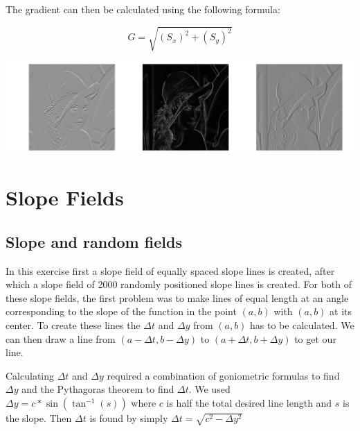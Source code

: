 \documentclass[a4paper,12px]{article}
\begin{document}
The gradient can then be calculated using the following formula:

$$ G = \sqrt{(S_x)^2 + (S_y)^2} $$

\begin{center}
    \includegraphics[width=\textwidth]{sobel}
\end{center}

\clearpage
\section{Slope Fields}
\subsection{Slope and random fields}

In this exercise first a slope field of equally spaced slope lines is created,
after which a slope field of 2000 randomly positioned slope lines is created.
For both of these slope fields, the first problem was to make lines of equal
length at an angle corresponding to the slope of the function in the point
$(a,b)$ with $(a,b)$ at its center. To create these lines the $\Delta t$ and
$\Delta y$ from $(a,b)$ has to be calculated. We can then draw a line from
$(a-\Delta t, b-\Delta y)$ to $(a+\Delta t, b+\Delta y)$ to get our line.

Calculating $\Delta t$ and $\Delta y$ required a combination of goniometric
formulas to find $\Delta y$ and the Pythagoras theorem to find $\Delta t$.  We
used $\Delta y = c*\sin(\tan^{-1}(s))$ where $c$ is half the total
desired line length and $s$ is the slope. Then $\Delta t$ is found by simply
$\Delta t= \sqrt{c^2-\Delta y^2}$
\end{document}
